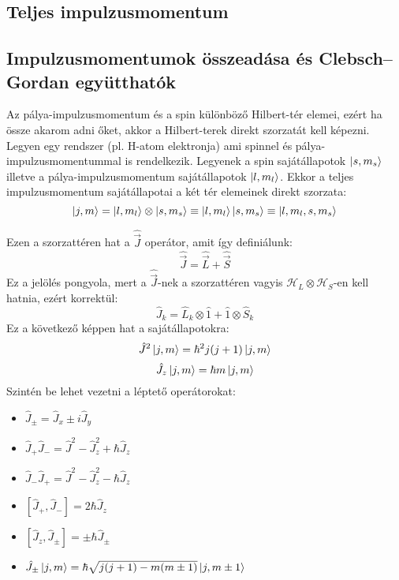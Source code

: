 \documentclass[12pt]{article}
\theoremstyle{plain}
\newcommand{\commut}[2]{\left [ #1 , #2 \right]}
\begin{document}
\subsection{Teljes impulzusmomentum}
\subsection{Impulzusmomentumok összeadása és Clebsch–Gordan együtthatók}
Az pálya-impulzusmomentum és a spin különböző Hilbert-tér elemei, ezért ha össze akarom adni őket,
akkor a Hilbert-terek direkt szorzatát kell képezni.
Legyen egy rendszer (pl. H-atom elektronja) ami spinnel és pálya-impulzusmomentummal is rendelkezik.
Legyenek a spin sajátállapotok $\ket{s, m_s}$ illetve a pálya-impulzusmomentum sajátállapotok $\ket{l, m_l}$.
Ekkor a teljes impulzusmomentum sajátállapotai a két tér elemeinek direkt szorzata:
\begin{equation}
    \ket{j, m} = \ket{l, m_l} \otimes \ket{s, m_s} \equiv \ket{l, m_l}\ket{s, m_s} \equiv \ket{l, m_l,s, m_s}
\end{equation} 

Ezen a szorzattéren hat a $\hat{\vec J}$ operátor, amit így definiálunk:
\begin{equation}
    \hat{\vec J} = \hat{\vec L} + \hat{\vec S}
\end{equation}
Ez a jelölés pongyola, mert a $\hat{\vec J}$-nek a szorzattéren vagyis $\mathcal{H}_L \otimes \mathcal{H}_S$-en kell hatnia,
ezért korrektül:
\begin{equation}
    \hat J_k = \hat L_k \otimes \hat 1 + \hat 1 \otimes \hat S_k
\end{equation}
Ez a következő képpen hat a sajátállapotokra:
\begin{equation}
    \hat J^2 \ket{j, m} = \hbar^2 j(j+1)\ket{j,m}
\end{equation}
\begin{equation}
    \hat J_z \ket{j, m} = \hbar m\ket{j,m}
\end{equation}
Szintén be lehet vezetni a léptető operátorokat:
\begin{itemize}
    \item $
        \hat J_{\pm} = \hat J_x \pm  i \hat J_y
    $
    \item $
       \hat J_+ \hat J_-  = \hat J ^2 - \hat J_z^2 + \hbar \hat J_z
    $
    \item $
       \hat J_- \hat J_+  = \hat J ^2 - \hat J_z^2 - \hbar \hat J_z
    $
    \item $
        \commut{\hat J_+}{\hat J_-} = 2 \hbar \hat J_z
    $
    \item $
        \commut{\hat J_z}{\hat J_{\pm}} = \pm \hbar \hat J_{\pm}
    $
    \item $
        \hat J_{\pm}\ket{j,m} = \hbar \sqrt{j(j+1) - m(m\pm1)}\ket{j,m\pm1}
    $
\end{itemize}
\end{document}
